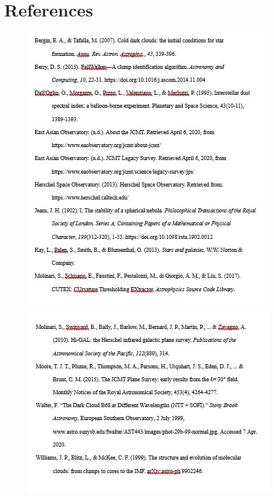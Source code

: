 \documentclass{article}
\begin{document}
\newpage

\section{References}
\begin{figure}[h!]
\includegraphics[width=\linewidth]{refspage1.jpg}
\end{figure}

\begin{figure}[t!]
\includegraphics[width=\linewidth]{refspage2.jpg}
\end{figure}
\end{document}
